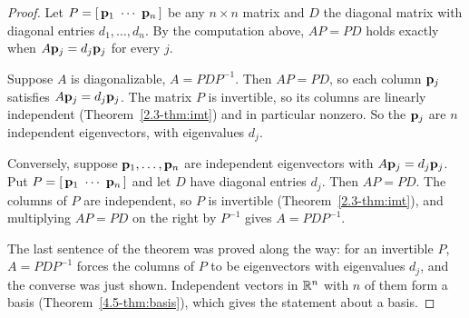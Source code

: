 \documentclass[11pt]{article}
\begin{document}
\begin{proof}
Let $P=[\,\bv{p}_1\ \cdots\ \bv{p}_n\,]$ be any $n\times n$ matrix and $D$ the diagonal matrix with diagonal entries $d_1,\dots,d_n$. By the computation above, $AP=PD$ holds exactly when $A\mathbf{p}_j=d_j\mathbf{p}_j$ for every $j$.

Suppose $A$ is diagonalizable, $A=PDP^{-1}$. Then $AP=PD$, so each column $\mathbf{p}_j$ satisfies $A\mathbf{p}_j=d_j\mathbf{p}_j$. The matrix $P$ is invertible, so its columns are linearly independent (Theorem~\ref{2.3-thm:imt}) and in particular nonzero. So the $\mathbf{p}_j$ are $n$ independent eigenvectors, with eigenvalues $d_j$.

Conversely, suppose $\mathbf{p}_1,\dots,\mathbf{p}_n$ are independent eigenvectors with $A\mathbf{p}_j=d_j\mathbf{p}_j$. Put $P=[\,\bv{p}_1\ \cdots\ \bv{p}_n\,]$ and let $D$ have diagonal entries $d_j$. Then $AP=PD$. The columns of $P$ are independent, so $P$ is invertible (Theorem~\ref{2.3-thm:imt}), and multiplying $AP=PD$ on the right by $P^{-1}$ gives $A=PDP^{-1}$.

The last sentence of the theorem was proved along the way: for an invertible $P$, $A=PDP^{-1}$ forces the columns of $P$ to be eigenvectors with eigenvalues $d_j$, and the converse was just shown. Independent vectors in $\mathbb{R}^n$ with $n$ of them form a basis (Theorem~\ref{4.5-thm:basis}), which gives the statement about a basis.
\end{proof}
\end{document}
